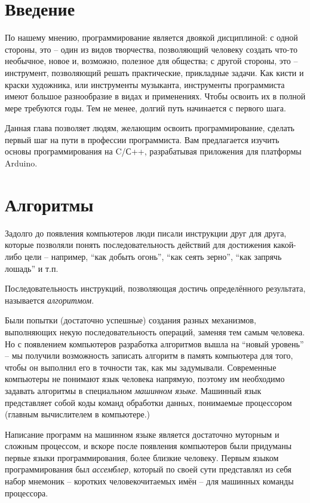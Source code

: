 \documentclass[a4paper,twoside]{book}
\begin{document}
\section{Введение}
По нашему мнению, программирование является двоякой дисциплиной: с одной
стороны, это – один из видов творчества, позволяющий человеку создать что-то
необычное, новое и, возможно, полезное для общества; с другой стороны, это –
инструмент, позволяющий решать практические, прикладные задачи. Как кисти и
краски художника, или инструменты музыканта, инструменты программиста имеют
большое разнообразие в видах и применениях. Чтобы освоить их в полной мере
требуются годы. Тем не менее, долгий путь начинается с первого шага.

Данная глава позволяет людям, желающим освоить программирование, сделать первый
шаг на пути в профессии программиста.  Вам предлагается изучить основы
программирования на C/С++, разрабатывая приложения для платформы Arduino.

\section{Алгоритмы}

Задолго до появления компьютеров люди писали инструкции друг для друга, которые
позволяли понять последовательность действий для достижения какой-либо цели --
например, ``как добыть огонь'', ``как сеять зерно'', ``как запрячь лошадь'' и
т.п.

Последовательность инструкций, позволяющая достичь определённого результата,
называется \emph{алгоритмом}.

Были попытки (достаточно успешные) создания разных механизмов, выполняющих некую
последовательность операций, заменяя тем самым человека.  Но с появлением
компьютеров разработка алгоритмов вышла на ``новый уровень'' -- мы получили
возможность записать алгоритм в память компьютера для того, чтобы он выполнил
его в точности так, как мы задумывали.  Современные компьютеры не понимают язык
человека напрямую, поэтому им необходимо задавать алгоритмы в специальном
\emph{машинном языке}.  Машинный язык представляет собой коды команд обработки
данных, понимаемые процессором (главным вычислителем в компьютере.)

Написание программ на машинном языке является достаточно муторным и сложным
процессом, и вскоре после появления компьютеров были придуманы первые языки
программирования, более близкие человеку.  Первым языком программирования был
\emph{ассемблер}, который по своей сути представлял из себя набор мнемоник --
коротких человекочитаемых имён -- для машинных команды процессора.
\end{document}
